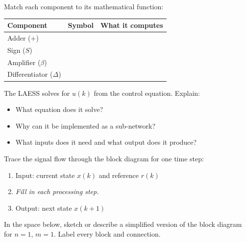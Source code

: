 \begin{answerbox}\end{answerbox}

Match each component to its mathematical function:

\medskip
\begin{tabularx}{\textwidth}{l c X}
\toprule
\textbf{Component} & \textbf{Symbol} & \textbf{What it computes} \\
\midrule
Adder ($+$)          & & \\[0.8em]
Sign ($S$)           & & \\[0.8em]
Amplifier ($\beta$)  & & \\[0.8em]
Differentiator ($\Delta$) & & \\
\bottomrule
\end{tabularx}

\begin{answerbox}\end{answerbox}

The LAESS solves for $u(k)$ from the control equation. Explain:
\begin{itemize}[nosep]
  \item What equation does it solve?
  \item Why can it be implemented as a sub-network?
  \item What inputs does it need and what output does it produce?
\end{itemize}

\begin{answerbox}\end{answerbox}

Trace the signal flow through the block diagram for one time step:
\begin{enumerate}[nosep]
  \item Input: current state $x(k)$ and reference $r(k)$
  \item[\textrm{2--$N$.}] \emph{Fill in each processing step.}
  \item[$N{+}1$.] Output: next state $x(k+1)$
\end{enumerate}

\begin{largeanswer}\end{largeanswer}

In the space below, sketch or describe a simplified version of the block diagram for $n=1$, $m=1$. Label every block and connection.

